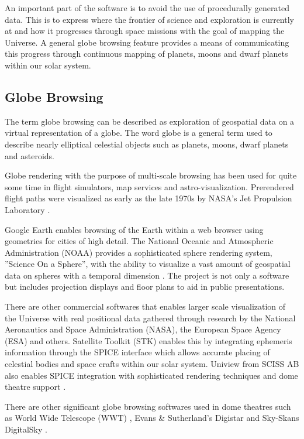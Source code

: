 An important part of the software is to avoid the use of procedurally generated data. This is to express where the frontier of science and exploration is currently at and how it progresses through space missions with the goal of mapping the Universe. A general globe browsing feature provides a means of communicating this progress through continuous mapping of planets, moons and dwarf planets within our solar system.

\subsection{Globe Browsing}

The term globe browsing can be described as exploration of geospatial data on a virtual representation of a globe. The word globe is a general term used to describe nearly elliptical celestial objects such as planets, moons, dwarf planets and asteroids.

Globe rendering with the purpose of multi-scale browsing has been used for quite some time in flight simulators, map services and astro-visualization. Prerendered flight paths were visualized as early as the late 1970s by NASA's Jet Propulsion Laboratory \cite{cozzi11}. 

Google Earth \cite{googlemaps} enables browsing of the Earth within a web browser using geometries for cities of high detail. The National Oceanic and Atmospheric Administration (NOAA) provides a sophisticated sphere rendering system, ''Science On a Sphere'', with the ability to visualize a vast amount of geospatial data on spheres with a temporal dimension \cite{sos}. The project is not only a software but includes projection displays and floor plans to aid in public presentations.

There are other commercial softwares that enables larger scale visualization of the Universe with real positional data gathered through research by the National Aeronautics and Space Administration (NASA), the European Space Agency (ESA) and others. Satellite Toolkit (STK) enables this by integrating ephemeris information through the SPICE interface \cite{spice} which allows accurate placing of celestial bodies and space crafts within our solar system. Uniview from SCISS AB also enables SPICE integration with sophisticated rendering techniques and dome theatre support \cite{uniview}.

There are other significant globe browsing softwares used in dome theatres such as World Wide Telescope (WWT) \cite{wwt}, Evans \& Sutherland's Digistar \cite{digistar} and Sky-Skans DigitalSky \cite{digitalsky}.

